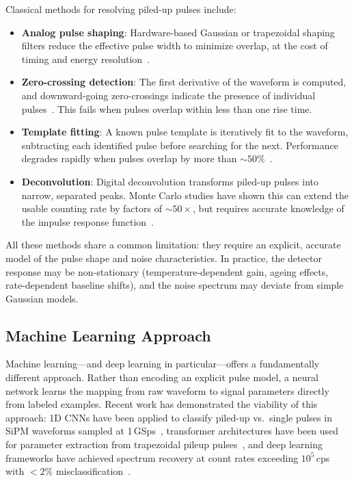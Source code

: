 \documentclass[11pt,twocolumn]{article}
\begin{document}
Classical methods for resolving piled-up pulses include:
\begin{itemize}
    \item \textbf{Analog pulse shaping}: Hardware-based Gaussian or trapezoidal shaping filters reduce the effective pulse width to minimize overlap, at the cost of timing and energy resolution~\cite{spieler2005semiconductor}.
    \item \textbf{Zero-crossing detection}: The first derivative of the waveform is computed, and downward-going zero-crossings indicate the presence of individual pulses~\cite{pileup2020correction}. This fails when pulses overlap within less than one rise time.
    \item \textbf{Template fitting}: A known pulse template is iteratively fit to the waveform, subtracting each identified pulse before searching for the next. Performance degrades rapidly when pulses overlap by more than ${\sim}50\%$~\cite{jordanov2003deconvolution}.
    \item \textbf{Deconvolution}: Digital deconvolution transforms piled-up pulses into narrow, separated peaks. Monte Carlo studies have shown this can extend the usable counting rate by factors of ${\sim}50\times$, but requires accurate knowledge of the impulse response function~\cite{jordanov2003deconvolution}.
\end{itemize}

All these methods share a common limitation: they require an explicit, accurate model of the pulse shape and noise characteristics.
In practice, the detector response may be non-stationary (temperature-dependent gain, ageing effects, rate-dependent baseline shifts), and the noise spectrum may deviate from simple Gaussian models.

\subsection{Machine Learning Approach}

Machine learning---and deep learning in particular---offers a fundamentally different approach.
Rather than encoding an explicit pulse model, a neural network learns the mapping from raw waveform to signal parameters directly from labeled examples.
Recent work has demonstrated the viability of this approach: 1D CNNs have been applied to classify piled-up vs.\ single pulses in SiPM waveforms sampled at 1\,GSps~\cite{cnn_nuclear2020}, transformer architectures have been used for parameter extraction from trapezoidal pileup pulses~\cite{transformer_pileup2022}, and deep learning frameworks have achieved spectrum recovery at count rates exceeding $10^5$\,cps with $<2\%$ misclassification~\cite{dl_pileup2025}.
\end{document}
